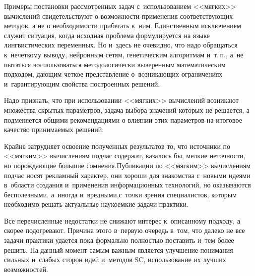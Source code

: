 \begin{multicols}{2}
     Примеры постановки рассмотренных задач с~использованием 
<<мягких>> вычислений свидетельствуют о возможности применения 
соответствующих методов, а не о необходимости прибегать к~ним. 
Единственным исключением служит ситуация, когда исходная проблема 
формулируется на языке лингвистических переменных. Но и~здесь не очевидно, 
что надо обращаться к~нечеткому выводу, нейронным сетям, генетическим 
алгоритмам и~т.\,п., а~не пытаться воспользоваться методологически 
выверенным математическим подходом, дающим четкое представление 
о~возникающих ограничениях и~гарантирующим свойства построенных 
решений.
     
     Надо признать, что при использовании <<мягких>> вычислений 
возникают множества скрытых параметров, задача выбора значений которых не 
решается, а подменяется общими рекомендациями о влиянии этих параметров 
на итоговое качество принимаемых решений.
     
     Крайне затрудняет освоение полученных результатов то, что источники 
по <<мягким>> вы\-чис\-лениям подчас содержат, казалось бы, мелкие 
не\-точности, но порождающие большие сомнения.\linebreak Публи\-ка\-ции по <<мягким>> 
вычислениям подчас \mbox{носят} рекламный характер, они хороши для знакомства 
с~новыми идеями в~области создания и~применения информационных 
технологий, но оказываются бесполезными, а~иногда и~вредными,\linebreak с~точки 
зрения специалистов, которым необходимо решать актуальные наукоемкие 
задачи практики.
     
     Все перечисленные недостатки не снижают интерес к~описанному 
подходу, а скорее подогревают. Причина этого в~первую очередь в~том, что 
далеко не все задачи практики удается пока формально полностью поставить 
и~тем более решить. На данный момент самым важным является улучшение 
понимания сильных и~слабых сторон идей и~методов SC, использование их 
лучших возможностей.

\vspace*{-8pt}

{\small\frenchspacing
{%
\begin{thebibliography}{99}

\vspace*{-2pt}


\end{thebibliography}}}
\end{multicols}
